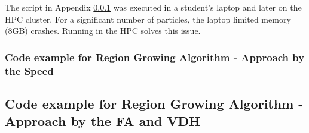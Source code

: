 \documentclass[12pt]{article}
\begin{document}
The script in Appendix \ref{App:App_speed_code} was executed in a student's
laptop and later on the HPC cluster. For a significant number of particles, the laptop limited memory (8GB) crashes. Running in the HPC solves this issue.


\subsubsection{Code example for Region Growing Algorithm - Approach by the Speed} \label{App:App_speed_code}
\tiny




\subsection{Code example for Region Growing Algorithm - Approach by the FA and VDH}
\label{App:own_impl_code}
\tiny


\normalsize
\end{document}
